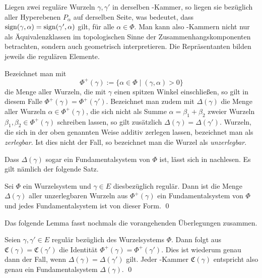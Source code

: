 Liegen zwei reguläre Wurzeln $\gamma, \gamma'$ in derselben \weyl\hyp{}Kammer, so liegen sie bezüglich aller Hyperebenen $P_\alpha$ auf derselben Seite, was bedeutet, dass $\operatorname{sign} (\gamma, \alpha) = \operatorname{sign}( \gamma', \alpha)$ gilt, für alle $\alpha \in \Phi$.
Man kann also \weyl\hyp{}Kammern nicht nur als Äquivalenzklassen im topologischen Sinne der Zusammenhangskomponenten betrachten, sondern auch geometrisch interpretieren.
Die Repräsentanten bilden jeweils die regulären Elemente.

Bezeichnet man mit
\begin{displaymath}
  \Phi^+(\gamma) := \{ \alpha \in \Phi \mid (\gamma, \alpha) > 0 \}
\end{displaymath}
die Menge aller Wurzeln, die mit $\gamma$ einen spitzen Winkel einschließen, so gilt in diesem Falle $\Phi^+(\gamma) = \Phi^+(\gamma')$.
Bezeichnet man zudem mit $\Delta(\gamma)$ die Menge aller Wurzeln $\alpha \in \Phi^+(\gamma)$, die sich nicht als Summe $\alpha = \beta_1 + \beta_2$ zweier Wurzeln $\beta_1, \beta_2 \in \Phi^+(\gamma)$ schreiben lassen, so gilt zusätzlich $\Delta(\gamma) = \Delta(\gamma')$. 
Wurzeln, die sich in der oben genannten Weise additiv zerlegen lassen, bezeichnet man als \emph{zerlegbar}. 
Ist dies nicht der Fall, so bezeichnet man die Wurzel als \emph{unzerlegbar}.

Dass $\Delta(\gamma)$ sogar ein Fundamentalsystem von $\Phi$ ist, lässt sich in \cite[S.48]{humphreys1972introduction} nachlesen.
Es gilt nämlich der folgende Satz.

\begin{thm}
  \label{thm:base}
  Sei $\Phi$ ein Wurzelsystem und $\gamma \in E$ diesbezüglich regulär.
  Dann ist die Menge $\Delta(\gamma)$ aller unzerlegbaren Wurzeln aus $\Phi^+(\gamma)$ ein Fundamentalsystem von $\Phi$ und jedes Fundamentalsystem ist von dieser Form. \qed
\end{thm}


Das folgende Lemma fasst nochmals die vorangehenden Überlegungen zusammen.

\begin{lem}
  \label{lem:correspondenceOfChambers}
  Seien $\gamma, \gamma' \in E$ regulär bezüglich des Wurzelsystems $\Phi$.
  Dann folgt aus $\mathfrak{C}(\gamma) = \mathfrak{C}(\gamma')$ die Identität $\Phi^+(\gamma) = \Phi^+(\gamma')$. 
  Dies ist wiederum genau dann der Fall, wenn $\Delta(\gamma) = \Delta(\gamma')$ gilt.
  Jeder \weyl\hyp{}Kammer $\mathfrak{C}(\gamma)$ entspricht also genau ein Fundamentalsystem $\Delta(\gamma)$. \qed
\end{lem}

